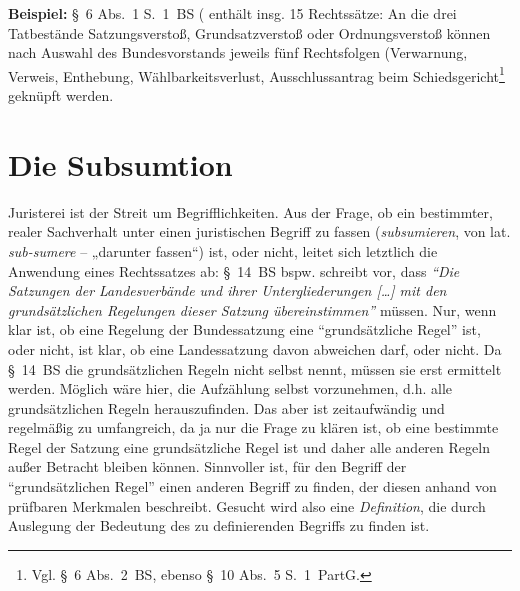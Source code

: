 \textbf{Beispiel:} \S~6 Abs.~1 S.~1~BS ( enthält insg. 15 Rechtssätze: An die drei Tatbestände Satzungsverstoß, Grundsatzverstoß oder Ordnungsverstoß können nach Auswahl des Bundesvorstands jeweils fünf Rechtsfolgen (Verwarnung, Verweis, Enthebung, Wählbarkeitsverlust, Ausschlussantrag beim Schiedsgericht\footnote{Vgl. \S~6 Abs.~2~BS, ebenso \S~10 Abs.~5 S.~1~PartG.} geknüpft werden.


\section{Die Subsumtion}
Juristerei ist der Streit um Begrifflichkeiten. Aus der Frage, ob ein bestimmter, realer Sachverhalt unter einen juristischen Begriff zu fassen (\emph{subsumieren}, von lat. \emph{sub-sumere} – „darunter fassen“) ist, oder nicht, leitet sich letztlich die Anwendung eines Rechtssatzes ab: \S~14~BS bspw. schreibt vor, dass \emph{\enquote{Die Satzungen der Landesverbände und ihrer Untergliederungen […] mit den grundsätzlichen Regelungen dieser Satzung übereinstimmen}} müssen. Nur, wenn klar ist, ob eine Regelung der Bundessatzung eine \enquote{grundsätzliche Regel} ist, oder nicht, ist klar, ob eine Landessatzung davon abweichen darf, oder nicht. Da \S~14~BS die grundsätzlichen Regeln nicht selbst nennt, müssen sie erst ermittelt werden. Möglich wäre hier, die Aufzählung selbst vorzunehmen, d.h. alle grundsätzlichen Regeln herauszufinden. Das aber ist zeitaufwändig und regelmäßig zu umfangreich, da ja nur die Frage zu klären ist, ob eine bestimmte Regel der Satzung eine grundsätzliche Regel ist und daher alle anderen Regeln außer Betracht bleiben können. Sinnvoller ist, für den Begriff der \enquote{grundsätzlichen Regel} einen anderen Begriff zu finden, der diesen anhand von prüfbaren Merkmalen beschreibt. Gesucht wird also eine \emph{Definition}, die durch Auslegung der Bedeutung des zu definierenden Begriffs zu finden ist.

